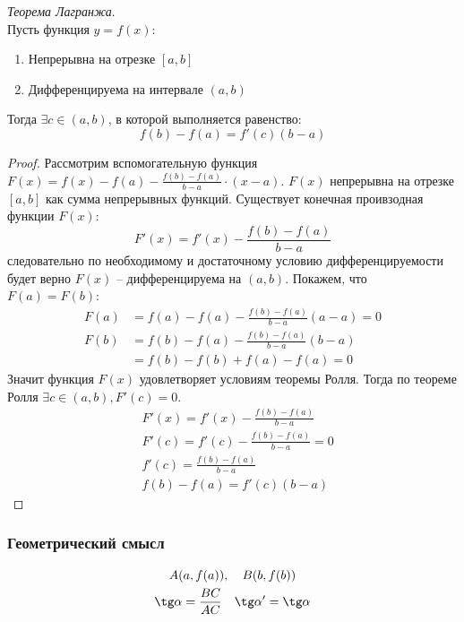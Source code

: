 \begin{theorem}
  \textit{Теорема Лагранжа}. \\
  Пусть функция $y = f(x)$:
   \begin{enumerate}
     \item Непрерывна на отрезке $[a, b]$
     \item Дифференцируема на интервале  $(a, b)$
  \end{enumerate}
  Тогда $\exists  c \in (a, b)$, в которой выполняется равенство: \[
    \boxed{f(b) - f(a) = f'(c)(b - a)}
  \] 
\end{theorem}
\begin{proof}
  Рассмотрим вспомогательную функция $F(x) = f(x) - f(a) - \frac{f(b) - f(a)}{b - a} \cdot (x - a)$. 
  $F(x)$ непрерывна на отрезке $[a, b]$ как сумма непрерывных функций. Существует конечная проивзодная функции $F(x)$: \[
  F'(x) = f'(x) - \frac{f(b) - f(a)}{b - a}
\]
следовательно по необходимому и достаточному условию дифференцируемости будет верно $F(x)$ -- дифференцируема на $(a, b)$.
  Покажем, что $F(a) = F(b)$:
  \begin{align*}
    F(a) &= f(a) - f(a) - \frac{f(b) - f(a)}{b - a}(a - a) = 0 \\
    F(b) &= f(b) - f(a) - \frac{f(b) - f(a)}{b - a}(b - a) \\
         &= f(b) - f(b) + f(a) - f(a) = 0
  \end{align*}
  Значит функция $F(x)$ удовлетворяет условиям теоремы Ролля. Тогда по теореме Ролля  $\exists c \in (a, b), F'(c) = 0$.
  \begin{align*}
    & F'(x) = f'(x) - \frac{f(b) - f(a)}{b - a} \\
    & F'(c) = f'(c) - \frac{f(b) - f(a)}{b - a} = 0 \\
    & f'(c) = \frac{f(b) - f(a)}{b - a} \\
    & f(b) - f(a) = f'(c) (b - a)
  \end{align*}
\end{proof}

\subsubsection*{Геометрический смысл}

\begin{gather*}
  A(a, f(a)), \quad B(b, f(b)) \\
  \tg \alpha = \frac{BC}{AC} \quad \tg \alpha' = \tg \alpha
\end{gather*}

